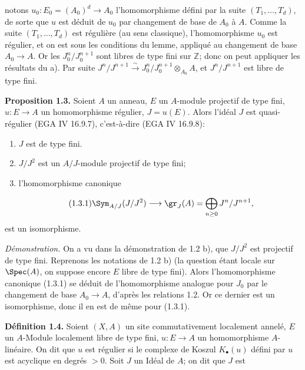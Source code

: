 notons $u_0:E_0=(A_0)^d\longrightarrow A_0$ l'homomorphisme défini par la suite $(T_1,\ldots,T_d)$, de sorte que $u$ est déduit de $u_0$ par changement de base de $A_0$ à $A$. Comme la suite $(T_1,\ldots,T_d)$ est régulière (au sens classique), l'homomorphisme $u_0$ est régulier, et on est sous les conditions du lemme, appliqué au changement de base $A_0\longrightarrow A$. Or les $J_0^n/J_0^{n+1}$ sont libres de type fini sur $\mathbb Z$; donc on peut appliquer les résultats du a). Par suite $J^n/J^{n+1}\xrightarrow{\sim}J_0^n/J_0^{n+1}\otimes_{A_0}A$, et $J^n/J^{n+1}$ est libre de type fini.

\textbf{Proposition 1.3.} Soient $A$ un anneau, $E$ un $A$-module projectif de type fini, $u:E\longrightarrow A$ un homomorphisme régulier, $J=u(E)$. Alors l'idéal $J$ est quasi-régulier (EGA IV 16.9.7), c'est-à-dire (EGA IV 16.9.8):
\begin{enumerate}[label=\roman*)]
\item $J$ est de type fini.
\item $J/J^2$ est un $A/J$-module projectif de type fini;
\item l'homomorphisme canonique
\end{enumerate}
\begin{equation}\tag{1.3.1}
 \Sym_{A/J}(J/J^2)\longrightarrow \gr_J(A)=\bigoplus_{n\geq0}J^n/J^{n+1},
\end{equation}
est un isomorphisme.

\emph{Démonstration.} On a vu dans la démonstration de 1.2 b), que $J/J^2$ est projectif de type fini. Reprenons les notations de 1.2 b) (la question étant locale sur $\Spec(A)$, on suppose encore $E$ libre de type fini). Alors l'homomorphisme canonique (1.3.1) se déduit de l'homomorphisme analogue pour $J_0$ par le changement de base $A_0\longrightarrow A$, d'après les relations 1.2. Or ce dernier est un isomorphisme, donc il en est de même pour (1.3.1).

\textbf{Définition 1.4.} Soient $(X,A)$ un site commutativement localement annelé, $E$ un $A$-Module localement libre de type fini, $u:E\longrightarrow A$ un homomorphisme $A$-linéaire. On dit que $u$ est régulier si le complexe de Koszul $K_\bullet(u)$ défini par $u$ est acyclique en degrés $>0$. Soit $J$ un Idéal de $A$; on dit que $J$ est
